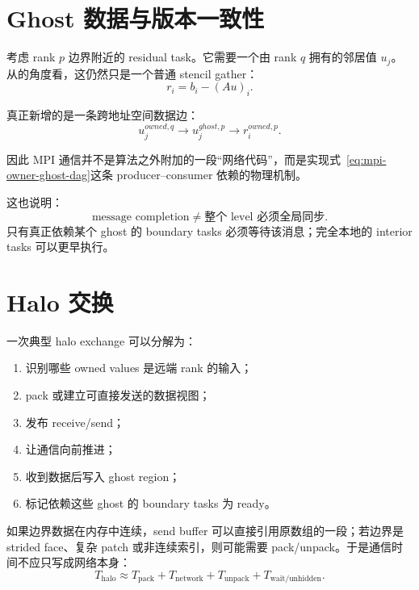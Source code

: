 \section{Ghost 数据与版本一致性}

考虑 rank $p$ 边界附近的 residual task。它需要一个由 rank $q$ 拥有的邻居值 $u_j$。从的角度看，这仍然只是一个普通 stencil gather：
\begin{equation}
r_i
=
b_i-(Au)_i.
\end{equation}

真正新增的是一条跨地址空间数据边：
\begin{equation}
u_j^{owned,q}
\longrightarrow
u_j^{ghost,p}
\longrightarrow
r_i^{owned,p}.
\label{eq:mpi-owner-ghost-dag}
\end{equation}

因此 MPI 通信并不是算法之外附加的一段“网络代码”，而是实现式~\eqref{eq:mpi-owner-ghost-dag}这条 producer--consumer 依赖的物理机制。

这也说明：
\begin{equation}
\boxed{
\text{message completion}
\neq
\text{整个 level 必须全局同步}.
}
\end{equation}
只有真正依赖某个 ghost 的 boundary tasks 必须等待该消息；完全本地的 interior tasks 可以更早执行。

\section{Halo 交换}
\label{sec:mpi-halo}

一次典型 halo exchange 可以分解为：
\begin{enumerate}
\item 识别哪些 owned values 是远端 rank 的输入；
\item pack 或建立可直接发送的数据视图；
\item 发布 receive/send；
\item 让通信向前推进；
\item 收到数据后写入 ghost region；
\item 标记依赖这些 ghost 的 boundary tasks 为 ready。
\end{enumerate}

如果边界数据在内存中连续，send buffer 可以直接引用原数组的一段；若边界是 strided face、复杂 patch 或非连续索引，则可能需要 pack/unpack。于是通信时间不应只写成网络本身：
\begin{equation}
T_{\mathrm{halo}}
\approx
T_{\mathrm{pack}}
+
T_{\mathrm{network}}
+
T_{\mathrm{unpack}}
+
T_{\mathrm{wait/unhidden}}.
\label{eq:mpi-halo-cost}
\end{equation}

